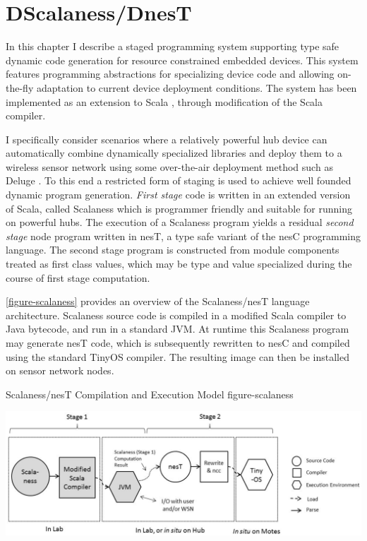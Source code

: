 
\chapter{DScalaness/DnesT}
\label{chapter-dscalaness-dnest}


In this chapter I describe a staged programming system supporting type safe dynamic code
generation for resource constrained embedded devices. This system features programming
abstractions for specializing device code and allowing on-the-fly adaptation to current device
deployment conditions. The system has been implemented as an extension to Scala \cite{PiS2},
through modification of the Scala compiler.

I specifically consider scenarios where a relatively powerful hub device can automatically
combine dynamically specialized libraries and deploy them to a wireless sensor network using
some over-the-air deployment method such as Deluge \cite{deluge04}. To this end a restricted
form of staging \cite{Taha-MetaML,DBLP:conf/icess/Taha04,289140} is used to achieve well founded
dynamic program generation. \emph{First stage} code is written in an extended version of Scala,
called Scalaness which is programmer friendly and suitable for running on powerful hubs. The
execution of a Scalaness program yields a residual \emph{second stage} node program written in
nesT, a type safe variant of the nesC programming language. The second stage program is
constructed from module components treated as first class values, which may be type and value
specialized during the course of first stage computation.

\autoref{figure-scalaness} provides an overview of the Scalaness/nesT language architecture.
Scalaness source code is compiled in a modified Scala compiler to Java bytecode, and run in a
standard JVM. At runtime this Scalaness program may generate nesT code, which is subsequently
rewritten to nesC and compiled using the standard TinyOS compiler. The resulting image can then
be installed on sensor network nodes.

\begin{fpfig*}[t]
  {Scalaness/nesT Compilation and Execution Model}
  {figure-scalaness}
  \begin{center}
    \includegraphics[scale=.54]{Figures/scalaness.eps}
  \end{center}
\end{fpfig*}

